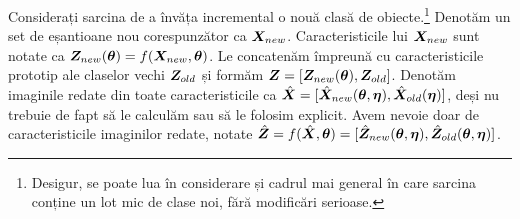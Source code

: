 \documentclass[../../book-main_ro.tex]{subfiles}
\begin{document}
Considerați sarcina de a învăța incremental o nouă clasă de obiecte.\footnote{Desigur, se poate lua în considerare și cadrul mai general în care sarcina conține un lot mic de clase noi, fără modificări serioase.} Denotăm un set de eșantioane nou corespunzător ca $\bm{X}_{new}$. Caracteristicile lui $\bm{X}_{new}$ sunt notate ca $\bm{Z}_{new}(\bm \theta) = f(\bm{X}_{new}, \bm \theta)$. Le concatenăm împreună cu caracteristicile prototip ale claselor vechi $\bm{Z}_{old}$ și formăm $\bm{Z} = [\bm{Z}_{new}(\bm \theta), \bm{Z}_{old}]$. Denotăm imaginile redate din toate caracteristicile ca $\hat{\bm{X}} = [{\hat{\bm{X}}_{new}(\bm \theta,\bm \eta)}, {\hat{\bm{X}}_{old}(\bm \eta)}]$, deși nu trebuie de fapt să le calculăm sau să le folosim explicit. Avem nevoie doar de caracteristicile imaginilor redate, notate $\hat{\bm{Z}} = f(\hat{\bm{X}}, \bm \theta) =  [{\hat{\bm{Z}}_{new}(\bm \theta,\bm \eta)}, {\hat{\bm{Z}}_{old}(\bm \theta,\bm \eta)}]$.
\end{document}
